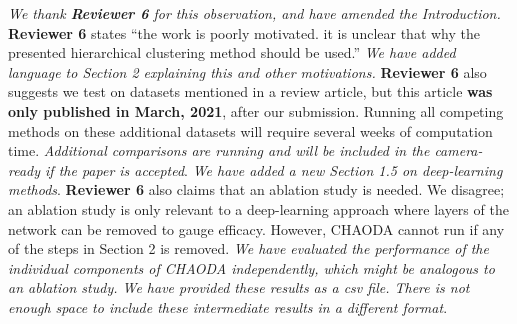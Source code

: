 \documentclass{article}
\begin{document}
\emph{We thank \textbf{Reviewer 6} for this observation, and have amended the Introduction.}
\textbf{Reviewer 6} states ``the work is poorly motivated. it is unclear that why the presented hierarchical clustering method should be used.''
\emph{We have added language to Section 2 explaining this and other motivations.}
\textbf{Reviewer 6} also suggests we test on datasets mentioned in a review article, but this article \textbf{was only published in March, 2021}, after our submission.
Running all competing methods on these additional datasets will require several weeks of computation time.
\emph{Additional comparisons are running and will be included in the camera-ready if the paper is accepted}.
\emph{We have added a new Section 1.5 on deep-learning methods}.
\textbf{Reviewer 6} also claims that an ablation study is needed.
We disagree; an ablation study is only relevant to a deep-learning approach where layers of the network can be removed to gauge efficacy.
However, CHAODA cannot run if any of the steps in Section 2 is removed.
\emph{We have evaluated the performance of the individual components of CHAODA independently, which might be analogous to an ablation study.
We have provided these results as a csv file. There is not enough space to include these intermediate results in a different format}.
\end{document}
